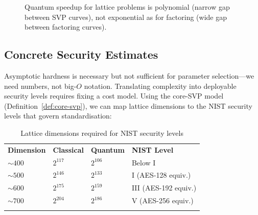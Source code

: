 \begin{figure}[t]
\centering
{}
\caption{Quantum speedup for lattice problems is polynomial (narrow gap between SVP curves), not exponential as for factoring (wide gap between factoring curves).}
\label{fig:ch06-quantum-speedup}
\end{figure}


\subsection{Concrete Security Estimates}
\label{subsec:concrete-security}

Asymptotic hardness is necessary but not sufficient for parameter selection---we need numbers, not big-$O$ notation.  Translating complexity into deployable security levels requires fixing a cost model.  Using the core-SVP model (Definition~\ref{def:core-svp}), we can map lattice dimensions to the NIST security levels that govern standardisation:

\begin{table}[t]
\caption{Lattice dimensions required for NIST security levels}
\label{tab:security-levels}
\begin{tabular}{p{2.5cm}p{2.5cm}p{2.5cm}p{3cm}}
\hline\noalign{\smallskip}
\textbf{Dimension} & \textbf{Classical} & \textbf{Quantum} & \textbf{NIST Level} \\
\noalign{\smallskip}\svhline\noalign{\smallskip}
$\sim 400$ & $2^{117}$ & $2^{106}$ & Below I \\
$\sim 500$ & $2^{146}$ & $2^{133}$ & I (AES-128 equiv.) \\
$\sim 600$ & $2^{175}$ & $2^{159}$ & III (AES-192 equiv.) \\
$\sim 700$ & $2^{204}$ & $2^{186}$ & V (AES-256 equiv.) \\
\noalign{\smallskip}\hline
\end{tabular}
\end{table}

